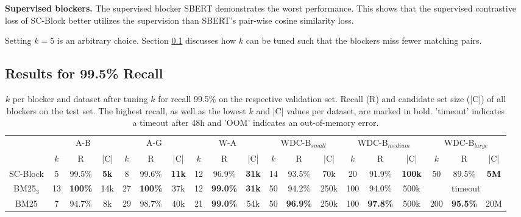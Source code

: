 \documentclass[sigconf,nonacm]{acmart}
\begin{document}
\vspace{.1cm}\noindent\textbf{Supervised blockers.}
The supervised blocker SBERT demonstrates the worst performance.
This shows that the supervised contrastive loss of SC-Block better utilizes the supervision than SBERT's pair-wise cosine similarity loss.

Setting $k=5$ is an arbitrary choice.
Section \ref{sub-sec:variable_nearest_neighbours} discusses how $k$ can be tuned such that the blockers miss fewer matching pairs.

\subsection{Results for 99.5\% Recall}
\label{sub-sec:variable_nearest_neighbours}

\begin{table*}[ht]
\caption{$k$ per blocker and dataset after tuning $k$ for recall 99.5\% on the respective validation set. Recall (R) and candidate set size (|C|) of all blockers on the test set. The highest recall, as well as the lowest $k$ and |C| values per dataset, are marked in bold. 'timeout' indicates a timeout after 48h and 'OOM' indicates an out-of-memory error.}
\label{tab:block_variable_k}
\begin{tabular}{@{}c|ccc|ccc|ccc|ccc|ccc|ccc}
\toprule
  &  \multicolumn{3}{c}{A-B}  &  \multicolumn{3}{c}{A-G}  &  \multicolumn{3}{c}{W-A}  &  \multicolumn{3}{c}{WDC-B$_{small}$} & \multicolumn{3}{c}{WDC-B$_{medium}$} & \multicolumn{3}{c}{WDC-B$_{large}$} \\  
 &  $k$  &  R         &  |C|       &  $k$  &  R         &  |C|    &  $k$  &  R        &  |C|      &  $k$  &  R          &  |C|    &  $k$ &  R         &  |C| &  $k$  &  R         &  |C|   \\ \midrule
SC-Block    & 5  & 99.5\%  & \textbf{5k}  & 8  & 99.6\%  & \textbf{11k} & 12 & 96.9\% & \textbf{31k}  & 14                   & 93.5\%               & 70k       & 20                   & 91.9\%               & \textbf{100k}      & 50 & 89.5\% & \textbf{5M}  \\
BM25$_3$       & 13 & \textbf{100\%} & 14k & 27 & \textbf{100\%} & 37k & 12 & \textbf{99.0\%} & \textbf{31k}  & 50                   & 94.2\%               & 250k               & 100                  & 94.0\%               & 500k               &                     \multicolumn{3}{c}{timeout} \\
BM25        & 7  & 94.7\%  & 8k  & 29 & 98.7\%  & 40k & 21 & \textbf{99.0\%} & 54k  & 50                   & \textbf{96.9\%}      & 250k               & 100                  & \textbf{97.8\%}               & 500k               &                   200 & \textbf{95.5\%}  & 20M                          \\

\end{tabular}
\end{table*}
\end{document}
